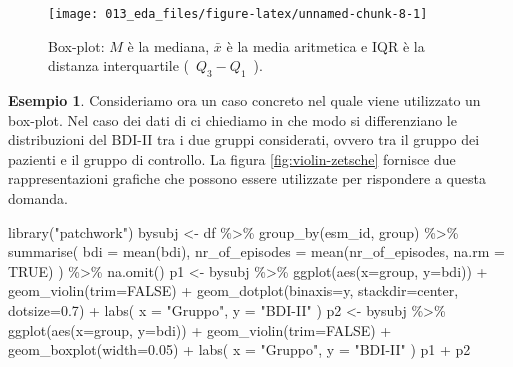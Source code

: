 \documentclass[
  11pt,
  italian,
  a4paper,
  extrafontsizes,onecolumn,openright
  ]{memoir}
\newenvironment{Shaded}{\begin{snugshade}}{\end{snugshade}}
\newcommand{\AttributeTok}[1]{\textcolor[rgb]{0.77,0.63,0.00}{#1}}
\newcommand{\ConstantTok}[1]{\textcolor[rgb]{0.00,0.00,0.00}{#1}}
\newcommand{\FloatTok}[1]{\textcolor[rgb]{0.00,0.00,0.81}{#1}}
\newcommand{\FunctionTok}[1]{\textcolor[rgb]{0.00,0.00,0.00}{#1}}
\newcommand{\NormalTok}[1]{#1}
\newcommand{\OtherTok}[1]{\textcolor[rgb]{0.56,0.35,0.01}{#1}}
\newcommand{\SpecialCharTok}[1]{\textcolor[rgb]{0.00,0.00,0.00}{#1}}
\newcommand{\StringTok}[1]{\textcolor[rgb]{0.31,0.60,0.02}{#1}}
\theoremstyle{definition}
\theoremstyle{definition}
\newtheorem{example}{Esempio}[chapter]
\theoremstyle{definition}
\theoremstyle{definition}
\theoremstyle{remark}
\begin{document}
\begin{figure}[h]

{\centering \texttt{[image: 013\_eda\_files/figure-latex/unnamed-chunk-8-1]} 

}

\caption{Box-plot: $M$ è la mediana, $\bar{x}$ è la media aritmetica e IQR è la distanza interquartile (~$Q_3 - Q_1$~).}\label{fig:unnamed-chunk-8}
\end{figure}

\begin{example}
Consideriamo ora un caso concreto nel quale viene utilizzato un box-plot.
Nel caso dei dati di \textcite{zetschefuture2019} ci chiediamo in che modo si differenziano le distribuzioni del BDI-II tra i due gruppi considerati, ovvero tra il gruppo dei pazienti e il gruppo di controllo. La figura \ref{fig:violin-zetsche} fornisce due rappresentazioni grafiche che possono essere utilizzate per rispondere a questa domanda.

\begin{Shaded}
\begin{Highlighting}[]
\FunctionTok{library}\NormalTok{(}\StringTok{"patchwork"}\NormalTok{)}
\NormalTok{bysubj }\OtherTok{\textless{}{-}}\NormalTok{ df }\SpecialCharTok{\%\textgreater{}\%} 
  \FunctionTok{group\_by}\NormalTok{(esm\_id, group) }\SpecialCharTok{\%\textgreater{}\%} 
  \FunctionTok{summarise}\NormalTok{(}
    \AttributeTok{bdi =} \FunctionTok{mean}\NormalTok{(bdi),}
    \AttributeTok{nr\_of\_episodes =} \FunctionTok{mean}\NormalTok{(nr\_of\_episodes, }\AttributeTok{na.rm =} \ConstantTok{TRUE}\NormalTok{)}
\NormalTok{  ) }\SpecialCharTok{\%\textgreater{}\%} 
  \FunctionTok{na.omit}\NormalTok{()}
\NormalTok{p1 }\OtherTok{\textless{}{-}}\NormalTok{ bysubj }\SpecialCharTok{\%\textgreater{}\%} 
  \FunctionTok{ggplot}\NormalTok{(}\FunctionTok{aes}\NormalTok{(}\AttributeTok{x=}\NormalTok{group, }\AttributeTok{y=}\NormalTok{bdi)) }\SpecialCharTok{+} 
  \FunctionTok{geom\_violin}\NormalTok{(}\AttributeTok{trim=}\ConstantTok{FALSE}\NormalTok{) }\SpecialCharTok{+}
  \FunctionTok{geom\_dotplot}\NormalTok{(}\AttributeTok{binaxis=}\StringTok{\textquotesingle{}y\textquotesingle{}}\NormalTok{, }\AttributeTok{stackdir=}\StringTok{\textquotesingle{}center\textquotesingle{}}\NormalTok{, }\AttributeTok{dotsize=}\FloatTok{0.7}\NormalTok{) }\SpecialCharTok{+}
  \FunctionTok{labs}\NormalTok{(}
    \AttributeTok{x =} \StringTok{"Gruppo"}\NormalTok{,}
    \AttributeTok{y =} \StringTok{"BDI{-}II"}
\NormalTok{  ) }
\NormalTok{p2 }\OtherTok{\textless{}{-}}\NormalTok{ bysubj }\SpecialCharTok{\%\textgreater{}\%} 
  \FunctionTok{ggplot}\NormalTok{(}\FunctionTok{aes}\NormalTok{(}\AttributeTok{x=}\NormalTok{group, }\AttributeTok{y=}\NormalTok{bdi)) }\SpecialCharTok{+} 
  \FunctionTok{geom\_violin}\NormalTok{(}\AttributeTok{trim=}\ConstantTok{FALSE}\NormalTok{) }\SpecialCharTok{+}
  \FunctionTok{geom\_boxplot}\NormalTok{(}\AttributeTok{width=}\FloatTok{0.05}\NormalTok{) }\SpecialCharTok{+}
  \FunctionTok{labs}\NormalTok{(}
    \AttributeTok{x =} \StringTok{"Gruppo"}\NormalTok{,}
    \AttributeTok{y =} \StringTok{"BDI{-}II"}
\NormalTok{  ) }
\NormalTok{p1 }\SpecialCharTok{+}\NormalTok{ p2}
\end{Highlighting}
\end{Shaded}


\end{example}
\end{document}

